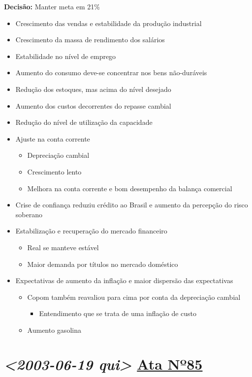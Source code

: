 \documentclass[11pt]{article}
\begin{document}
\textbf{Decisão:} Manter meta em 21\%
\begin{itemize}
\item Crescimento das vendas e estabilidade da produção industrial
\item Crescimento da massa de rendimento dos salários
\item Estabilidade no nível de emprego
\item Aumento  do consumo deve-se concentrar nos bens não-duráveis
\item Redução dos estoques, mas acima do nível desejado
\item Aumento dos custos decorrentes do repasse cambial
\item Redução do nível de utilização da capacidade
\item Ajuste na conta corrente
\begin{itemize}
\item Depreciação cambial
\item Crescimento lento
\item Melhora na conta corrente e bom desempenho da balança comercial
\end{itemize}
\item Crise de confiança reduziu crédito ao Brasil e aumento da percepção do risco soberano
\item Estabilização e recuperação do mercado financeiro
\begin{itemize}
\item Real se manteve estável
\item Maior demanda por títulos no mercado doméstico
\end{itemize}
\item Expectativas de aumento da inflação e maior dispersão das expectativas
\begin{itemize}
\item Copom também reavaliou para cima por conta da depreciação cambial
\begin{itemize}
\item Entendimento que se trata de uma inflação de custo
\end{itemize}
\item Aumento gasolina
\end{itemize}
\end{itemize}

\section*{\textit{<2003-06-19 qui> } \href{https://www.bcb.gov.br/publicacoes/atascopom/01062003}{Ata Nº85}}
\label{sec:org73ebb00}
\end{document}
